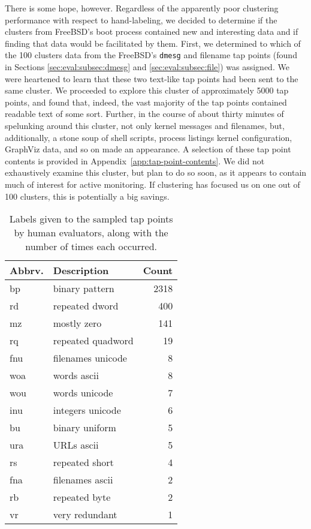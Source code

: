 There is some hope, however.  
Regardless of the apparently poor clustering performance with respect to 
hand-labeling, we decided to determine if the clusters from FreeBSD's
boot process contained new and interesting data and if finding that data
would be facilitated by them.  
First, we determined to which of the 100 clusters data from the
FreeBSD's \texttt{dmesg} and filename tap points (found in Sections
\ref{sec:eval:subsec:dmesg} and \ref{sec:eval:subsec:file}) was assigned.  
We were heartened to learn that these two text-like tap points 
had been sent to the same cluster.
We proceeded to explore this cluster of approximately 5000 tap points, 
and found that, indeed, the vast majority of the tap points contained 
readable text of some sort.  
Further, in the course of about thirty minutes of spelunking around this
cluster, not only kernel messages and filenames, but, additionally, a 
stone soup of shell scripts, process listings kernel configuration, 
GraphViz data, and so on made an appearance.  
A selection of these tap point contents is provided in 
Appendix~\ref{app:tap-point-contents}.
We did not exhaustively examine this cluster, but plan to do so soon,
as it appears to contain much of interest for active monitoring.
If clustering has focused us on one out of 100 clusters, this is 
potentially a big savings.

\begin{table}
    \centering
    \small
    \begin{tabular}{|l|l|r|}
        \hline
        Abbrv. & Description & Count \\
        \hline
        bp  &  binary pattern &  2318  \\
        rd  &  repeated dword &  400  \\
        mz  &  mostly zero &  141  \\
        rq  &  repeated quadword &  19  \\
        fnu  &  filenames unicode &  8  \\
        woa  &  words ascii &  8  \\
        wou  &  words unicode &  7  \\
        inu  &  integers unicode &  6  \\
        bu  &  binary uniform &  5  \\
        ura  &  URLs ascii &  5  \\
        rs  &  repeated short &  4  \\
        fna  &  filenames ascii &  2  \\
        rb  &  repeated byte &  2  \\
        vr  &  very redundant &  1  \\
        \hline
    \end{tabular}
\caption{Labels given to the sampled tap points by human evaluators,
along with the number of times each occurred.}
\label{tbl:clustlabels}
\end{table}

